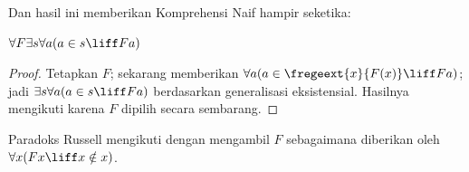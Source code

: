 \documentclass[../../../include/open-logic-section]{subfiles}
\begin{document}
Dan hasil ini memberikan Komprehensi Naif hampir seketika:

\begin{lem}
$\forall F \exists s \forall a (a \in s \liff Fa)$
\end{lem}

\begin{proof}
Tetapkan $F$; sekarang  memberikan
$\forall a (a \in \fregeext{x}{F(x)} \liff Fa)$; jadi
$\exists s\forall a(a \in s \liff Fa)$ berdasarkan generalisasi
eksistensial. Hasilnya mengikuti karena $F$ dipilih secara sembarang.
\end{proof}

Paradoks Russell mengikuti dengan mengambil $F$ sebagaimana diberikan oleh
$\forall x(Fx \liff x \notin x)$.
\end{document}
